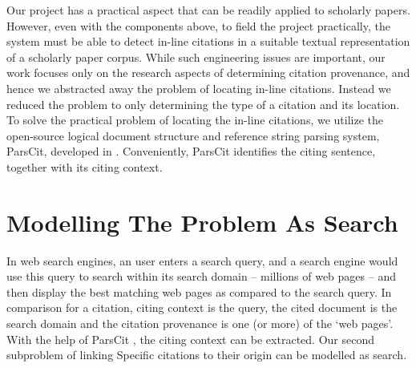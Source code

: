 Our project has a practical aspect that can be readily applied to scholarly papers.  However, even with the components above, to field the project practically, the system must be able to detect in-line citations in a suitable textual representation of a scholarly paper corpus. 
While such engineering issues are important, our work focuses only on the research aspects of determining citation provenance, and hence we abstracted away the problem of locating in-line citations.  Instead we reduced the problem to only determining the type of a citation and its location. To solve the practical problem of locating the in-line citations, we utilize the open-source logical document structure and reference string parsing system, ParsCit, developed in . Conveniently, ParsCit identifies the citing sentence, together with its citing context.

\section{Modelling The Problem As Search}
In web search engines, an user enters a search query, and a search engine would use this query to search within its search domain -- millions of web pages -- and then display the best matching web pages as compared to the search query. 
In comparison for a citation, citing context is the query, the cited document is the search domain and the citation provenance is one (or more) of the `web pages'. With the help of ParsCit \cite{parscit}, the citing context can be extracted.
Our second subproblem of linking Specific citations to their origin can be modelled as search.


